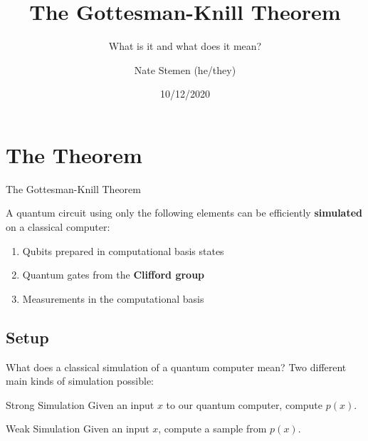 \documentclass[11pt,aspectratio=1610]{beamer}
\title{The Gottesman-Knill Theorem}
\subtitle{What is it and what does it mean?}
\date{10/12/2020}
\author{Nate Stemen (he/they)}
\institute{QIC 710 Final Project}
\begin{document}
\maketitle


\section{The Theorem}

\begin{frame}{The Gottesman-Knill Theorem}
	\begin{theorem}
		A quantum circuit using only the following elements can be efficiently \textbf{simulated} on a classical computer:
		\begin{enumerate}
			\item Qubits prepared in computational basis states
			\item Quantum gates from the \textbf{Clifford group}
			\item Measurements in the computational basis
		\end{enumerate}
	\end{theorem}
\end{frame}

\subsection{Setup}

\begin{frame}{What does a classical simulation of a quantum computer mean?}
	Two different main kinds of simulation possible:\pause
	\begin{exampleblock}{Strong Simulation}
		Given an input $x$ to our quantum computer, compute $p(x)$.
	\end{exampleblock}\pause
	\begin{exampleblock}{Weak Simulation}
		Given an input $x$, compute a sample from $p(x)$.
	\end{exampleblock}
\end{frame}
\end{document}
